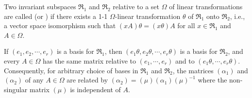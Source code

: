 Two invariant subspaces $\mathfrak{R}_1$ and $\mathfrak{R}_2$ relative to a set $\Omega$ of linear transformations are called  (or ) if there exists a 1-1 $\Omega$-linear transformation $\theta$ of $\mathfrak{R}_1$ onto $\mathfrak{R}_2$, i.e., a vector space isomorphism such that $(xA)\theta = (x\theta)A$ for all $x \in \mathfrak{R}_1$ and $A \in \Omega$.

If $(e_1, e_2, \cdots, e_r)$ is a basis for $\mathfrak{R}_1$, then $(e_1\theta, e_2\theta, \cdots, e_r\theta)$ is a basis for $\mathfrak{R}_2$, and every $A \in \Omega$ has the same matrix relative to $(e_1, \cdots, e_r)$ and to $(e_1\theta, \cdots, e_r\theta)$. Consequently, for arbitrary choice of bases in $\mathfrak{R}_1$ and $\mathfrak{R}_2$, the matrices $(\alpha_1)$ and $(\alpha_2)$ of any $A \in \Omega$ are related by $(\alpha_2) = (\mu)(\alpha_1)(\mu)^{-1}$ where the non-singular matrix $(\mu)$ is independent of $A$.
